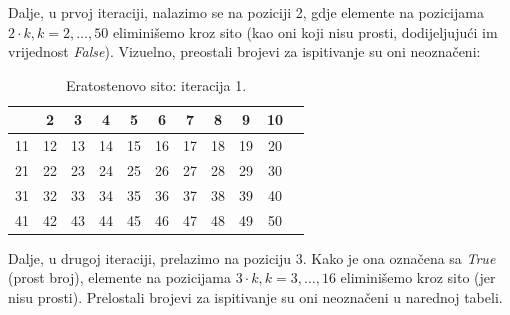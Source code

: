 Dalje, u prvoj iteraciji, nalazimo se na poziciji 2, gdje elemente na pozicijama $2 \cdot k, k=2, \ldots, 50$ eliminišemo kroz sito (kao oni koji nisu prosti, dodijeljujući im vrijednost \emph{False}). Vizuelno, preostali brojevi za ispitivanje su oni neoznačeni:



\begin{table}[H]
	\centering
	\begin{tabular}{|c|c|c|c|c|c|c|c|c|c|c} \hline
		& 2 & 3 & \cellcolor{red!30}  4 & 5 & \cellcolor{red!30} 6 & 7 & \cellcolor{red!30} 8 & 9 & \cellcolor{red!30} 10 \\ \hline
		11 &\cellcolor{red!30}  12 & 13 & \cellcolor{red!30} 14 & 15 & \cellcolor{red!30} 16 & 17 & \cellcolor{red!30} \cellcolor{red!30} 18 & 19 & \cellcolor{red!30} \cellcolor{red!30} 20 \\ \hline
		21 & \cellcolor{red!30} 22 & 23 & \cellcolor{red!30} 24 & 25 & \cellcolor{red!30} 26 & 27 &\cellcolor{red!30}  28 & 29 & \cellcolor{red!30} \cellcolor{red!30} 30 \\ \hline
		31 & \cellcolor{red!30} 32 & 33 & \cellcolor{red!30} 34 & 35 & \cellcolor{red!30} 36 & 37 & \cellcolor{red!30} 38 & 39 & \cellcolor{red!30} 40 \\ \hline
		41 & \cellcolor{red!30} 42 & 43 & \cellcolor{red!30} 44 & 45 & \cellcolor{red!30} 46 & 47 &\cellcolor{red!30}  48 & 49 &\cellcolor{red!30}  50 \\ \hline     
	\end{tabular}
        \caption{Eratostenovo sito: iteracija 1.} \label{eratosten-sieve-it-1}
\end{table}



Dalje, u drugoj iteraciji, prelazimo na poziciju 3. Kako je ona označena sa \emph{True} (prost broj), elemente na pozicijama $3\cdot k, k=3, \ldots, 16$ eliminišemo kroz sito (jer nisu prosti). Prelostali brojevi za ispitivanje su oni neoznačeni u narednoj tabeli. 


